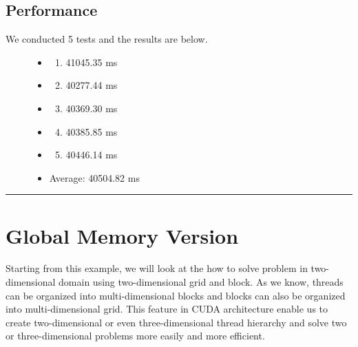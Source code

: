 \documentclass[letterpaper,10pt,openany,oneside]{sphinxmanual}
\begin{document}
\subsection{Performance}
\label{CUDA2D/CUDA2D:performance}\begin{description}
\item[{We conducted 5 tests and the results are below.}] \leavevmode\begin{itemize}
\item {} \begin{enumerate}
\item {} 
41045.35 ms

\end{enumerate}

\item {} \begin{enumerate}
\setcounter{enumi}{1}
\item {} 
40277.44 ms

\end{enumerate}

\item {} \begin{enumerate}
\setcounter{enumi}{2}
\item {} 
40369.30 ms

\end{enumerate}

\item {} \begin{enumerate}
\setcounter{enumi}{3}
\item {} 
40385.85 ms

\end{enumerate}

\item {} \begin{enumerate}
\setcounter{enumi}{4}
\item {} 
40446.14 ms

\end{enumerate}

\item {} 
Average: 40504.82 ms

\end{itemize}

\end{description}


\bigskip\hrule{}\bigskip



\section{Global Memory Version}
\label{CUDA2D/CUDA2D:global-memory-version}
Starting from this example, we will look at the how to solve problem in two-dimensional domain using two-dimensional grid and block. As we know, threads can be organized into multi-dimensional blocks and blocks can also be organized into multi-dimensional grid. This feature in CUDA architecture enable us to create two-dimensional or even three-dimensional thread hierarchy and solve two or three-dimensional problems more easily and more efficient.
\end{document}
